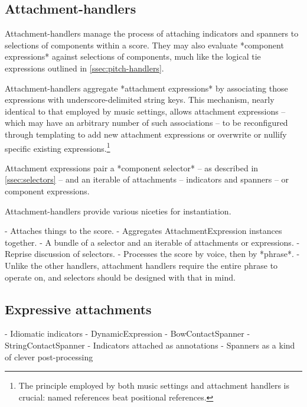\subsection{Attachment-handlers}
\label{ssec:attachment-handlers}

Attachment-handlers manage the process of attaching indicators and spanners to
selections of components within a score. They may also evaluate *component
expressions* against selections of components, much like the logical tie
expressions outlined in \autoref{ssec:pitch-handlers}.

Attachment-handlers aggregate *attachment expressions* by associating those
expressions with underscore-delimited string keys. This mechanism, nearly
identical to that employed by music settings, allows attachment expressions --
which may have an arbitrary number of such associations -- to be reconfigured
through templating to add new attachment expressions or overwrite or nullify
specific existing expressions.\footnote{The principle employed by both music
settings and attachment handlers is crucial: named references beat positional
references.}

Attachment expressions pair a *component selector* -- as described in
\autoref{ssec:selectors} -- and an iterable of attachments -- indicators and
spanners -- or component expressions.

Attachment-handlers provide various niceties for instantiation.

\begin{markdown}
-   Attaches things to the score.
-   Aggregates AttachmentExpression instances together.
    -   A bundle of a selector and an iterable of attachments or
        expressions.
    -   Reprise discussion of selectors.
-   Processes the score by voice, then by *phrase*.
    -   Unlike the other handlers, attachment handlers require the entire
        phrase to operate on, and selectors should be designed with that in
        mind.
\end{markdown}

\subsection{Expressive attachments}
\label{ssec:expressive-attachments}

\begin{markdown}
-   Idiomatic indicators
-   DynamicExpression
-   BowContactSpanner
-   StringContactSpanner
-   Indicators attached as annotations
-   Spanners as a kind of clever post-processing
\end{markdown}

